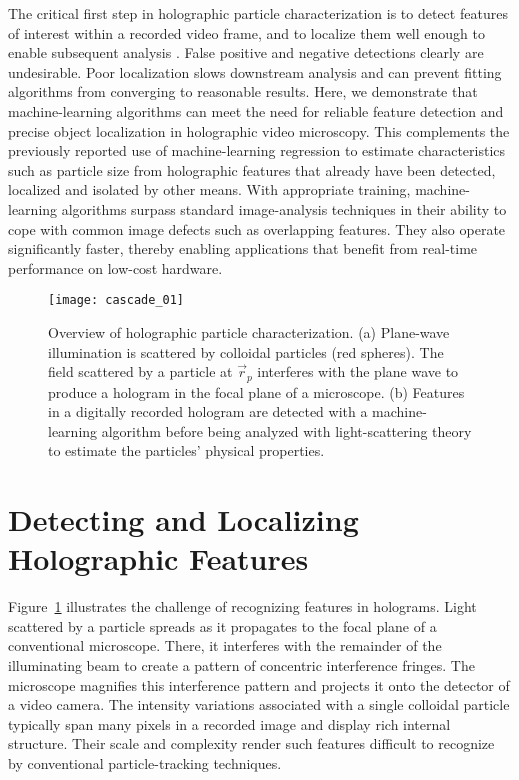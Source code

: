 The critical first step in holographic particle characterization
is to detect features of interest within a recorded video frame,
and to localize them well enough to enable subsequent 
analysis  \cite{crocker96,cheong09,yevick14,krishnatreya14a}.
False positive and negative detections clearly are undesirable.
Poor localization slows downstream analysis
\cite{yevick14,krishnatreya14a} and can prevent fitting algorithms 
from converging to reasonable results.
Here, we demonstrate that machine-learning algorithms can meet the
need for reliable feature detection and precise object localization in
holographic video microscopy.
This complements the previously reported \cite{yevick14}
use of machine-learning regression to estimate
characteristics such as particle size from holographic
features that already have been detected, localized
and isolated by other means.
With appropriate training, machine-learning algorithms
surpass standard image-analysis
techniques in their ability to cope with common image defects
such as overlapping features.
They also operate significantly faster, thereby enabling
applications that benefit from real-time performance on low-cost
hardware.

\begin{figure}[b!]
  \centering
  \texttt{[image: cascade\_01]}	
  \caption{Overview of holographic particle characterization. (a) Plane-wave 
  illumination is scattered by colloidal particles (red spheres). The 
  field scattered by a particle at $\vec{r}_p$ interferes with the plane wave
  to produce a hologram in the focal
  plane of a microscope.
  (b) Features in a digitally recorded hologram are
  detected with a machine-learning algorithm before being
  analyzed with light-scattering 
  theory to estimate the particles' physical properties.}
  \label{fig:characterization}
\end{figure}

\section{Detecting and Localizing Holographic Features}

Figure~\ref{fig:characterization} illustrates the challenge of
recognizing features in holograms.
Light scattered by a particle 
spreads as it propagates to the focal plane of a conventional
microscope.
There, it interferes with the remainder of the illuminating beam
to create a pattern of concentric interference fringes.
The microscope magnifies this interference pattern and
projects it onto
the detector of a video camera.
The intensity variations
associated with a single colloidal particle
typically span many pixels in a recorded image
and display rich internal structure.
Their scale and complexity render such features difficult to
recognize by conventional
particle-tracking techniques.
  
